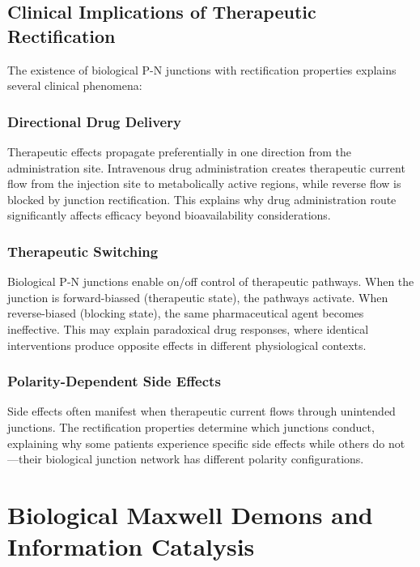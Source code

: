 \documentclass{article}
\theoremstyle{definition}
\theoremstyle{remark}
\begin{document}
\subsection{Clinical Implications of Therapeutic Rectification}

The existence of biological P-N junctions with rectification properties explains several clinical phenomena:

\subsubsection{Directional Drug Delivery}

Therapeutic effects propagate preferentially in one direction from the administration site. Intravenous drug administration creates therapeutic current flow from the injection site to metabolically active regions, while reverse flow is blocked by junction rectification. This explains why drug administration route significantly affects efficacy beyond bioavailability considerations.

\subsubsection{Therapeutic Switching}

Biological P-N junctions enable on/off control of therapeutic pathways. When the junction is forward-biassed (therapeutic state), the pathways activate. When reverse-biased (blocking state), the same pharmaceutical agent becomes ineffective. This may explain paradoxical drug responses, where identical interventions produce opposite effects in different physiological contexts.

\subsubsection{Polarity-Dependent Side Effects}

Side effects often manifest when therapeutic current flows through unintended junctions. The rectification properties determine which junctions conduct, explaining why some patients experience specific side effects while others do not—their biological junction network has different polarity configurations.

\section{Biological Maxwell Demons and Information Catalysis}
\end{document}
